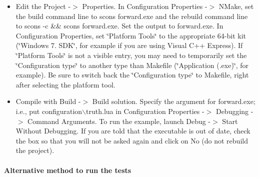 \documentclass{tufte-book}
\begin{document}
\begin{itemize}
\item \-Edit the \-Project -\/$>$ \-Properties. \-In \-Configuration \-Properties -\/$>$ \-N\-Make, set the build command line to {\ttfamily scons forward.\-exe} and the rebuild command line to {\ttfamily scons -\/c \&\& scons forward.\-exe}. \-Set the output to {\ttfamily forward.\-exe}. \-In \-Configuration \-Properties, set \char`\"{}\-Platform Tools\char`\"{} to the appropriate 64-\/bit kit (\char`\"{}\-Windows 7. S\-D\-K\char`\"{}, for example if you are using \-Visual \-C++ \-Express). \-If \char`\"{}\-Platform Tools\char`\"{} is not a visible entry, you may need to temporarily set the \char`\"{}\-Configuration type\char`\"{} to another type than \-Makefile (\char`\"{}\-Application (.\-exe)\char`\"{}, for example). \-Be sure to switch back the \char`\"{}\-Configuration type\char`\"{} to \-Makefile, right after selecting the platform tool.


\item \-Compile with \-Build -\/$>$ \-Build solution. \-Specify the argument for {\ttfamily forward.\-exe}; i.\-e., put {\ttfamily configuration$\backslash$truth.\-lua} in \-Configuration \-Properties -\/$>$ \-Debugging -\/$>$ \-Command \-Arguments. \-To run the example, launch \-Debug -\/$>$ \-Start \-Without \-Debugging. \-If you are told that the executable is out of date, check the box so that you will not be asked again and click on {\ttfamily \-No} (do not rebuild the project).
\end{itemize}

\hypertarget{installation_alternative}{}\paragraph{\-Alternative method to run the tests}\label{installation_alternative}
\end{document}
